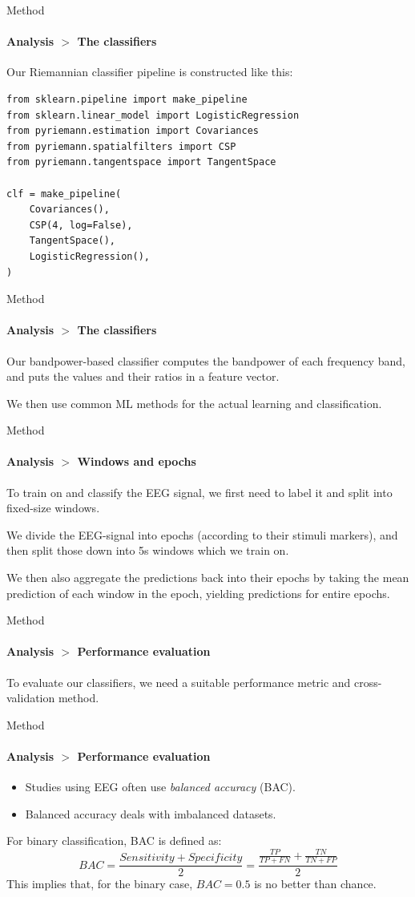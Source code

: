 \documentclass[xcolor={dvipsnames,table},12pt]{beamer}
\begin{document}
\begin{frame}[fragile]{Method}
    \framesubtitle{Analysis $>$ The classifiers}

    Our Riemannian classifier pipeline is constructed like this:
    
\begin{verbatim}
from sklearn.pipeline import make_pipeline
from sklearn.linear_model import LogisticRegression
from pyriemann.estimation import Covariances
from pyriemann.spatialfilters import CSP
from pyriemann.tangentspace import TangentSpace

clf = make_pipeline(
    Covariances(),
    CSP(4, log=False),
    TangentSpace(),
    LogisticRegression(),
)
\end{verbatim}
\end{frame}

\begin{frame}{Method}
    \framesubtitle{Analysis $>$ The classifiers}

    Our bandpower-based classifier computes the bandpower of each frequency band, and puts the values and their ratios in a feature vector. 

    We then use common ML methods for the actual learning and classification.
\end{frame}


\begin{frame}{Method}
    \framesubtitle{Analysis $>$ Windows and epochs}
    To train on and classify the EEG signal, we first need to label it and split into fixed-size windows.

    We divide the EEG-signal into epochs (according to their stimuli markers), and then split those down into 5s windows which we train on.

    We then also aggregate the predictions back into their epochs by taking the mean prediction of each window in the epoch, yielding predictions for entire epochs.
\end{frame}

\begin{frame}{Method}
    \framesubtitle{Analysis $>$ Performance evaluation}
    To evaluate our classifiers, we need a suitable performance metric and cross-validation method.
\end{frame}

\begin{frame}{Method}
    \framesubtitle{Analysis $>$ Performance evaluation}
    \begin{itemize}
        \item Studies using EEG often use \emph{balanced accuracy} (BAC).
        \item Balanced accuracy deals with imbalanced datasets.
    \end{itemize}

    \vspace{2em}

    For binary classification, BAC is defined as:
    \[ BAC = \frac{Sensitivity + Specificity}{2} = \frac{\frac{TP}{TP + FN} + \frac{TN}{TN + FP}}{2} \]
    This implies that, for the binary case, $BAC = 0.5$ is no better than chance.
\end{frame}
\end{document}

